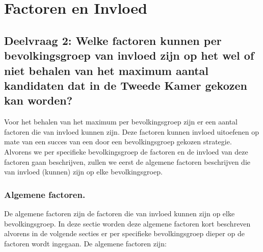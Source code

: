 \newpage
\section{Factoren en Invloed}
\label{h5}



\subsection*{Deelvraag 2: Welke factoren kunnen per bevolkingsgroep van invloed zijn op het wel of niet behalen van het maximum aantal kandidaten dat in de Tweede Kamer gekozen kan worden?}
Voor het behalen van het maximum per bevolkingsgroep zijn er een aantal factoren die van invloed kunnen zijn. Deze factoren kunnen invloed uitoefenen op mate van een succes van een door een bevolkingsgroep gekozen strategie. Alvorens we per specifieke bevolkingsgroep de factoren en de invloed van deze factoren gaan beschrijven, zullen we eerst de algemene factoren beschrijven die van invloed (kunnen) zijn op elke bevolkingsgroep.

\subsubsection*{Algemene factoren.}
De algemene factoren zijn de factoren die van invloed kunnen zijn op elke bevolkingsgroep. In deze sectie worden deze algemene factoren kort beschreven alvorens in de volgende secties er per specifieke bevolkingsgroep dieper op de factoren wordt ingegaan. De algemene factoren zijn:\\

